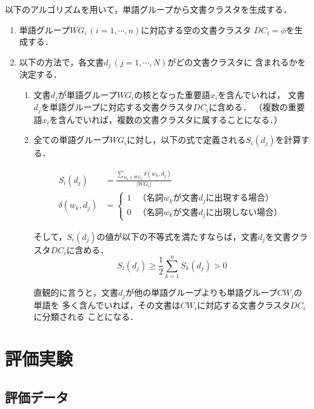 \documentclass[japanese]{jnlp_1.4}
\begin{document}
以下のアルゴリズムを用いて，単語グループから文書クラスタを生成する．
\begin{enumerate}
\item 単語グループ$WG_i\,(i=1,\cdots,n)$に対応する空の文書クラスタ
  $DC_i=\phi$を生成する．
\item 以下の方法で，各文書$d_j\,(j=1,\cdots,N)$がどの文書クラスタに
  含まれるかを決定する．
  \begin{enumerate}
  \item 文書$d_j$が単語グループ$WG_i$の核となった重要語$x_i$を含んでいれば，
    文書$d_j$を単語グループに対応する文書クラスタ$DC_i$に含める．
    （複数の重要語$x_i$を含んでいれば，複数の文書クラスタに属することになる．）

  \item 全ての単語グループ$WG_i$に対し，以下の式で定義される$S_i(d_j)$を計算する．
    
    \begin{align}
      S_i(d_j) &= \frac {\sum_{w_k\in{WG_i}}\delta(w_k,d_j)} {|WG_i|} \\
      \delta(w_k,d_j) &= \begin{cases}
        1 & \text{（名詞$w_k$が文書$d_j$に出現する場合）}\\
        0 & \text{（名詞$w_k$が文書$d_j$に出現しない場合）}
	\end{cases}  \nonumber 
    \end{align}
    
    そして，$S_i(d_j)$の値が以下の不等式を満たすならば，文書$d_j$を文書クラスタ$DC_i$に含める．
    \begin{equation}
      S_i(d_j) \geq \frac{1}{2}\sum_{k=1}^n S_k(d_j) > 0
    \end{equation}
    
    直観的に言うと，文書$d_j$が他の単語グループよりも単語グループ$CW_i$の単語を
    多く含んでいれば，その文書は$CW_i$に対応する文書クラスタ$DC_i$に分類される
    ことになる．
  \end{enumerate}
\end{enumerate}



\section{評価実験} \label{sec:evaluation}


\subsection{評価データ}
\end{document}
